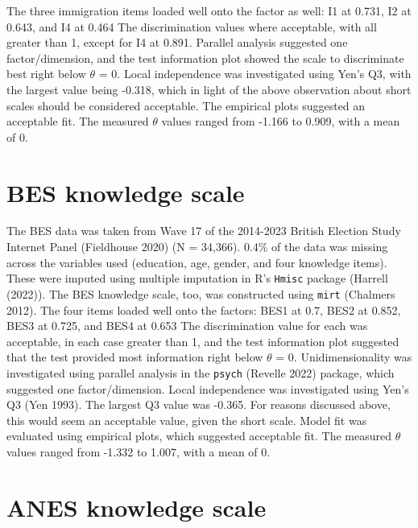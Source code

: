 \documentclass[11pt,halfline,a4paper,]{ouparticle}
\begin{document}
The three immigration items loaded well onto the factor as well: I1 at
0.731, I2 at 0.643, and I4 at 0.464 The discrimination values where
acceptable, with all greater than 1, except for I4 at 0.891. Parallel
analysis suggested one factor/dimension, and the test information plot
showed the scale to discriminate best right below \(\theta\) = 0. Local
independence was investigated using Yen's Q3, with the largest value
being -0.318, which in light of the above observation about short scales
should be considered acceptable. The empirical plots suggested an
acceptable fit. The measured \(\theta\) values ranged from -1.166 to
0.909, with a mean of 0.

\hypertarget{bes-knowledge-scale}{%
\section{BES knowledge scale}\label{bes-knowledge-scale}}

The BES data was taken from Wave 17 of the 2014-2023 British Election
Study Internet Panel (Fieldhouse 2020) (N = 34,366). 0.4\% of the data
was missing across the variables used (education, age, gender, and four
knowledge items). These were imputed using multiple imputation in R's
\texttt{Hmisc} package (Harrell (2022)). The BES knowledge scale, too,
was constructed using \texttt{mirt} (Chalmers 2012). The four items
loaded well onto the factors: BES1 at 0.7, BES2 at 0.852, BES3 at 0.725,
and BES4 at 0.653 The discrimination value for each was acceptable, in
each case greater than 1, and the test information plot suggested that
the test provided most information right below \(\theta\) = 0.
Unidimensionality was investigated using parallel analysis in the
\texttt{psych} (Revelle 2022) package, which suggested one
factor/dimension. Local independence was investigated using Yen's Q3
(Yen 1993). The largest Q3 value was -0.365. For reasons discussed
above, this would seem an acceptable value, given the short scale. Model
fit was evaluated using empirical plots, which suggested acceptable fit.
The measured \(\theta\) values ranged from -1.332 to 1.007, with a mean
of 0.

\hypertarget{anes-knowledge-scale}{%
\section{ANES knowledge scale}\label{anes-knowledge-scale}}
\end{document}
